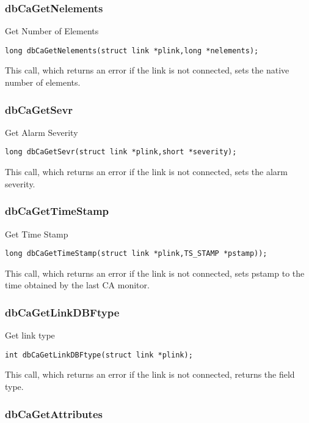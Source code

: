 \subsubsection{dbCaGetNelements}

Get Number of Elements

\begin{verbatim}long dbCaGetNelements(struct link *plink,long *nelements);
\end{verbatim}This call, which returns an error if the link is not connected, sets the native number of elements.

\subsubsection{dbCaGetSevr}

Get Alarm Severity

\begin{verbatim}long dbCaGetSevr(struct link *plink,short *severity);
\end{verbatim}This call, which returns an error if the link is not connected, sets the alarm severity.

\subsubsection{dbCaGetTimeStamp}

Get Time Stamp

\begin{verbatim}long dbCaGetTimeStamp(struct link *plink,TS_STAMP *pstamp));
\end{verbatim}This call, which returns an error if the link is not connected, sets pstamp to the time obtained by the last CA monitor.

\subsubsection{dbCaGetLinkDBFtype}

Get link type

\begin{verbatim}int dbCaGetLinkDBFtype(struct link *plink);
\end{verbatim}This call, which returns an error if the link is not connected, returns the field type.

\subsubsection{dbCaGetAttributes}

